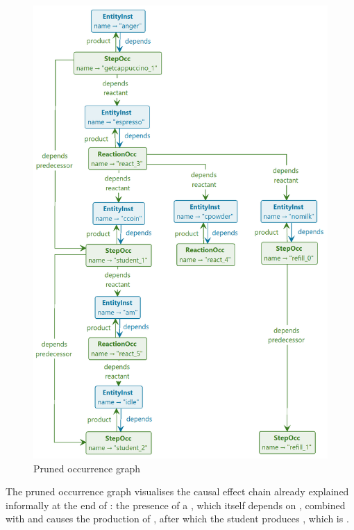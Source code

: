 \begin{figure}
\centering
\includegraphics[width=\columnwidth]{figs/toy-pruned}
\caption{Pruned occurrence graph}
\label{fig:toy-pruned}
\end{figure}

The pruned occurrence graph visualises the causal effect chain already explained informally at the end of : the presence of a \ccoin, which itself depends on \am, combined with \cpowder and \nomilk causes the production of \espresso, after which the student produces \anger, which is \Forbidden.

